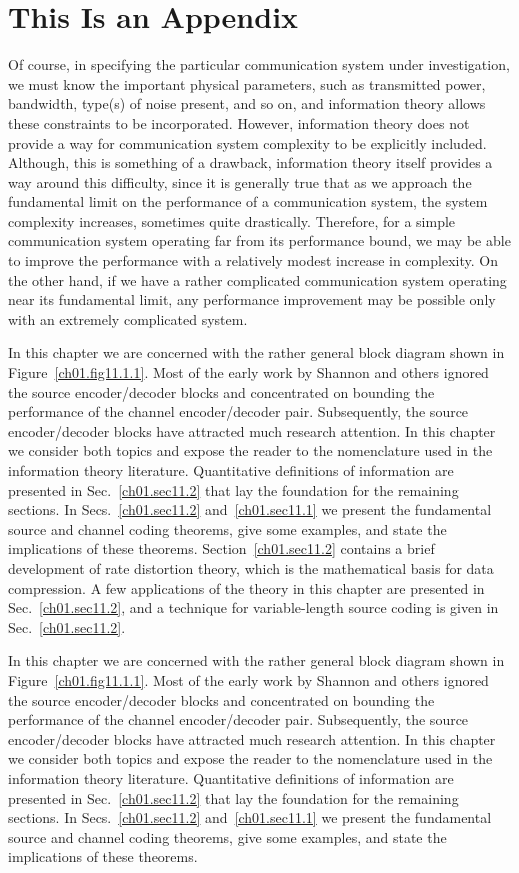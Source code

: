 \appendix
\chapter{This Is an Appendix}

Of course, in specifying the particular communication system under
investigation, we must know the important physical parameters,
such as transmitted
power, bandwidth, type(s) of noise present, and so on,
and information theory allows these constraints to be incorporated.
However, information theory does not provide a way for communication system
complexity to be explicitly included.
Although, this is something of a drawback, information theory itself provides
a way around this difficulty, since it is generally true that as we approach
the fundamental limit on the performance of a communication system,
the system complexity increases, sometimes quite drastically.
Therefore, for a simple communication system operating far
from its performance bound, we may be able to improve the performance
with a relatively modest increase in complexity.
On the other hand, if we have a rather complicated communication system
operating near its fundamental limit, any performance improvement may
be possible only with an extremely complicated system.

In this chapter we are concerned with the rather general block diagram
shown in Figure~\ref{ch01.fig11.1.1}. Most of the early work by
Shannon and others ignored the source  encoder/decoder blocks and
concentrated  on bounding the performance of the channel
encoder/decoder pair. Subsequently, the source  encoder/decoder blocks
have attracted much research attention.  In this chapter we consider
both topics and expose the reader to the nomenclature used in the
information theory literature.
Quantitative definitions of information are presented in
Sec.~\ref{ch01.sec11.2} that lay the foundation for the remaining
sections. In Secs.~\ref{ch01.sec11.2} and~\ref{ch01.sec11.1} we present
the fundamental source and channel coding theorems, give some examples,
and state the implications of these theorems.
Section~\ref{ch01.sec11.2} contains a brief development of rate
distortion theory,
which is the mathematical basis for data compression.
A few applications of the theory in this chapter are presented
in Sec.~\ref{ch01.sec11.2}, and a technique for variable-length
source coding is given in Sec.~\ref{ch01.sec11.2}.

In this chapter we are concerned with the rather general block diagram
shown in Figure~\ref{ch01.fig11.1.1}. Most of the early work by
Shannon and others ignored the source  encoder/decoder blocks and
concentrated  on bounding the performance of the channel
encoder/decoder pair. Subsequently, the source  encoder/decoder blocks
have attracted much research attention.  In this chapter we consider
both topics and expose the reader to the nomenclature used in the
information theory literature.
Quantitative definitions of information are presented in
Sec.~\ref{ch01.sec11.2} that lay the foundation for the remaining
sections. In Secs.~\ref{ch01.sec11.2} and~\ref{ch01.sec11.1} we present
the fundamental source and channel coding theorems, give some examples,
and state the implications of these theorems.

